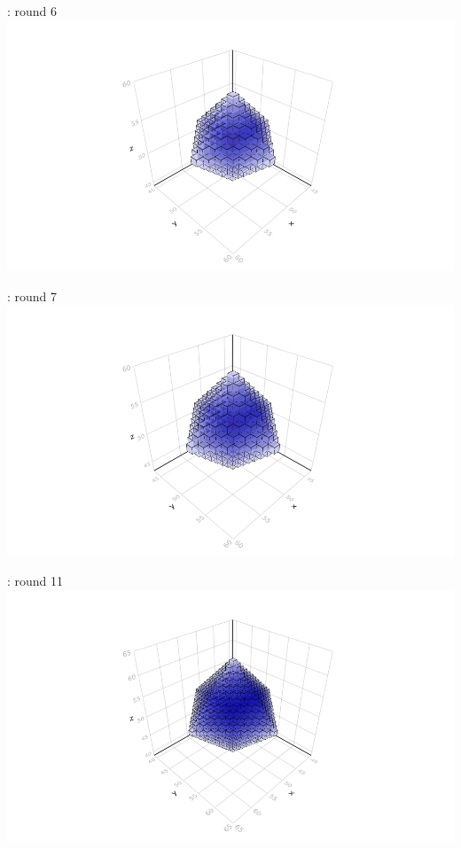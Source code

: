 \documentclass{beamer}
\begin{document}
\begin{frame}{\insertsubsection : round 6}
  \includegraphics[trim=5cm 0.7cm 5cm 3cm, clip, width=1\linewidth]{algorithm_visualisation/srgsteps/srgstep5.png}\\
\end{frame}
\begin{frame}{\insertsubsection : round 7}
  \includegraphics[trim=5cm 0.7cm 5cm 3cm, clip, width=1\linewidth]{algorithm_visualisation/srgsteps/srgstep6.png}\\
\end{frame}
\begin{frame}{\insertsubsection : round 11}
  \includegraphics[trim=5cm 0.7cm 5cm 3cm, clip, width=1\linewidth]{algorithm_visualisation/srgsteps/srgstep10.png}\\
\end{frame}
\end{document}
